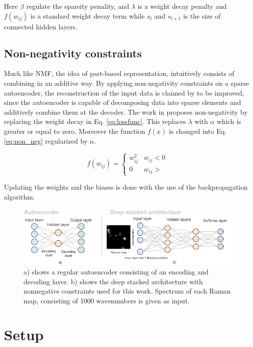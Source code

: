 \documentclass{article}
\begin{document}
Here $\beta$ regulate the sparsity penality, and $\lambda$ is a  weight decay penalty and $f(w_{ij})$ is a standard weight decay term while $s_l$ and $s_{l+1}$ is the size of connected hidden layers. 

\subsection{Non-negativity constraints}
\label{sec:prior}

Much like NMF, the idea of part-based representation, intuitively consists of combining in an additive way. By applying non-negativity constraints on a sparse autoencoder, the reconstruction of the input data is claimed by \cite{Hosseini-Asl2016} to be improved, since the autoencoder is capable of decomposing data into sparse elements and additively combine them at the decoder. The work in \cite{Hosseini-Asl2016} proposes non-negativity by replacing the weight decay in Eq. \eqref{eq:lossfunc}. This replaces $\lambda$ with $\alpha$ which is greater or equal to zero. Moreover the function $f(x)$ is changed into Eq. \eqref{eq:non_neg} regularized by $\alpha$. 

\begin{equation}
\label{eq:non_neg}
f(w_{ij}) = \begin{cases}
  w_{ij}^2 & w_{ij} < 0 \\
  0 & w_{ij} >
\end{cases} 
\end{equation}

Updating the weights and the biases is done with the use of the backpropagation algorithm. 


\begin{figure}[!h]
  \includegraphics[width=1\textwidth]{figures_4/setup_diagram.png}
  \caption{a) shows a regular autoencoder consisting of an encoding and decoding layer. b) shows the deep stacked architecture with nonnegative constraints used for this work. Spectrum of each Raman map, consisting of 1000 wavenumbers is given as input. }\label{fig:setup}
\end{figure}

\section{Setup}
\label{sec:setup}
\end{document}

